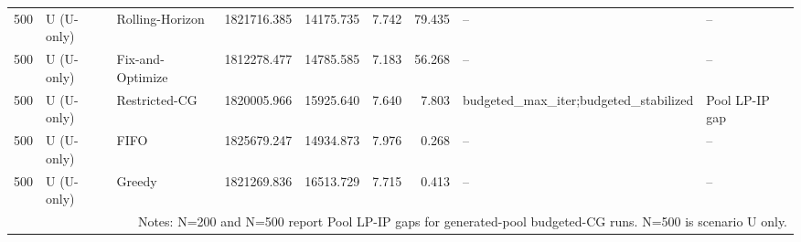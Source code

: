 \begin{tabular}{rllrrrrll}
500 & U (U-only) & Rolling-Horizon & 1821716.385 & 14175.735 & 7.742 & 79.435 & -- & -- \\
500 & U (U-only) & Fix-and-Optimize & 1812278.477 & 14785.585 & 7.183 & 56.268 & -- & -- \\
500 & U (U-only) & Restricted-CG & 1820005.966 & 15925.640 & 7.640 & 7.803 & budgeted_max_iter;budgeted_stabilized & Pool LP-IP gap \\
500 & U (U-only) & FIFO & 1825679.247 & 14934.873 & 7.976 & 0.268 & -- & -- \\
500 & U (U-only) & Greedy & 1821269.836 & 16513.729 & 7.715 & 0.413 & -- & -- \\
\multicolumn{9}{p{0.98\linewidth}}{\footnotesize Notes: N=200 and N=500 report Pool LP-IP gaps for generated-pool budgeted-CG runs. N=500 is scenario U only.}\\
\bottomrule
\end{tabular}
